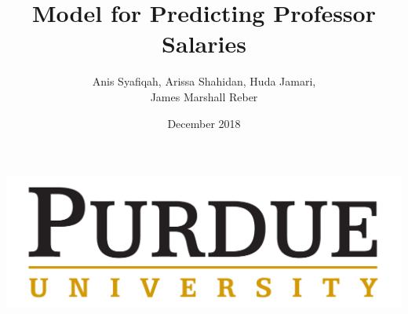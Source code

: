 \documentclass[svgnames,english]{beamer} %
\begin{document}
\author[Anis, Arissa, Huda, James]{Anis Syafiqah, Arissa Shahidan, Huda Jamari, \\James Marshall Reber}
\title[Professor Salaries]{Model for Predicting Professor Salaries}

\date{December 2018}
\begin{frame}
  \titlepage
\begin{center}
    \includegraphics[scale=0.1]{purduelogo2.png}
\end{center}
\end{frame}
\end{document}
